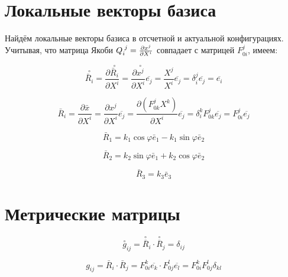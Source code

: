 \documentclass[14pt,a4paper]{scrartcl}
\begin{document}
\pagebreak

\section{Локальные векторы базиса}

Найдём локальные векторы базиса в отсчетной и актуальной конфигурациях. Учитывая, что матрица Якоби $Q_i^{\;j} = \pdv{x^j}{X^i}$ совпадает с матрицей $F_{0i}^j$, имеем:

\begin{equation*}
\overset{\circ}{\bar{R}_{i}}=\frac{\partial \overset{\circ}{\bar{R}_{i}}}{\partial X^{i}}=\frac{\partial \overset{\circ}{x^j}}{\partial X^{i}} \overline{e_{j}}= \frac{X^j}{X^i}\overline{e_{j}} = \delta_{i}^j\overline{e_{j}}=\overline{e_{i}}
\end{equation*}


\begin{equation*}
\bar{R}_{i}=\frac{\partial \bar{x}}{\partial X^{i}}=\frac{\partial x^{j}}{\partial X^{i}} \overline{e_{j}}=\frac{\partial\left(F_{0 k}^{j} X^{k}\right)}{\partial X^{i}} \overline{e_{j}}=\delta_{i}^{k} F_{0 k}^{j} \overline{e_{j}}=F_{0 i}^{j} \overline{e_{j}}
\end{equation*}

\begin{equation*}
	\bar{R}_{1}=k_{1} \cos \varphi \bar{e}_{1}-k_{1} \sin \varphi \bar{e}_{2}
\end{equation*}


\begin{equation*}
	\bar{R}_{2}=k_{2} \sin \varphi \bar{e}_{1}+k_{2} \cos \varphi \bar{e}_{2}
\end{equation*}

\begin{equation*}
	\bar{R}_{3}=k_{3} \bar{e}_{3}
\end{equation*}



\section{Метрические матрицы}




\begin{equation*}
	\overset{\circ}{g}_{ij} = \overset{\circ}{\overline{R}}_i \cdot \overset{\circ}{\overline{R}}_j = \delta_{ij}
\end{equation*}


\begin{equation*}
	g_{i j}=\bar{R}_{i} \cdot \bar{R}_{j}=F_{0 i}^{k} \overline{e_{k}} \cdot F_{0 j}^{l} \overline{e_{l}}=F_{0 i}^{k} F_{0 j}^{l} \delta_{k l}	
\end{equation*}
\end{document}
